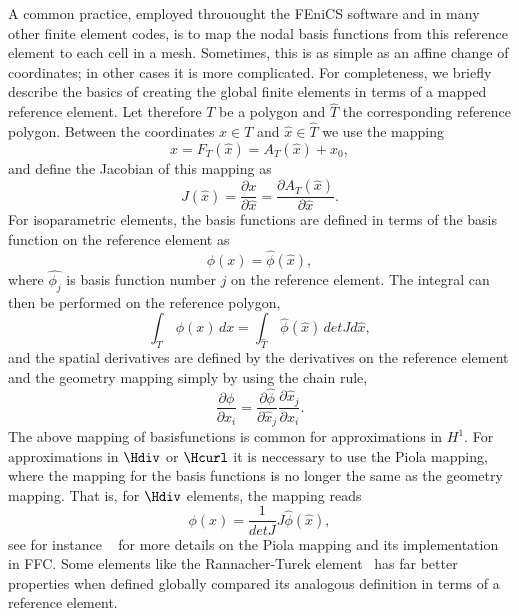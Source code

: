 A common practice, employed throuought the FEniCS
software and in many other finite element codes, is to map the nodal
basis functions from this reference element to each cell in a mesh.
Sometimes, this is as simple as an affine change of coordinates; in
other cases it is more complicated.
For completeness, we briefly describe the basics of creating the global finite elements in terms of a mapped
reference element. Let therefore $T$ be a polygon and $\hat{T}$ the corresponding reference polygon.
Between the coordinates
$x\in T$ and $\hat x\in\hat T$ we use the mapping
\begin{equation}
\label{eq:geometry}
x = F_T(\hat x) = A_T(\hat x)  + x_0,
\end{equation}
and define the Jacobian of this mapping as
\begin{equation}
\label{eq:geometry2}
J(\hat x) =  \frac{\partial x }{\partial \hat x}  =    \frac{\partial A_T(\hat x) }{\partial \hat x} .
\end{equation}
For isoparametric elements, the basis functions are defined in terms of the basis function
on the reference element as
\begin{equation}
\label{eq:subs}
\phi(x) = \hat{\phi}(\hat x),
\end{equation}
where $\hat{\phi_j}$ is basis function number $j$ on the reference element.
The integral can then be performed on the reference polygon,
\begin{equation}
\label{eq:integration2}
\int_T \, \phi (x) \, dx = \int_{\hat{T}} \, \hat \phi (\hat x) \, detJ d\hat x ,
\end{equation}
and the spatial derivatives are defined by the derivatives on the
reference element and the geometry mapping simply by using the
chain rule,
\begin{equation}
\label{eq:chain}
\frac{\partial \phi}{\partial x_i} =
\frac{\partial \hat \phi}{\partial \hat x_j} \frac{\partial \hat x_j }{\partial x_i }  .
\end{equation}
The above mapping of basisfunctions is common for approximations in $H^1$. For approximations in $\Hdiv$ or
$\Hcurl$ it is neccessary to use the Piola mapping, where the mapping for the basis functions
is no longer the same as the geometry mapping. That is, for $\Hdiv$ elements, the mapping reads  
\begin{equation}
\label{eq:subs}
\phi(x) = \frac{1}{detJ} J \hat{\phi}(\hat x),
\end{equation}
see for instance ~\citep{RognesKirbyLogg2009} for more details on the Piola mapping and its implementation in FFC.   
Some elements like the Rannacher-Turek element~\cite{Turek1999,RannacherTurek1992} has far better
properties when defined globally compared its analogous definition in terms
of a reference element.

